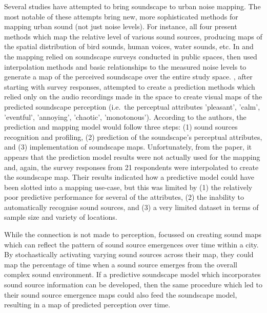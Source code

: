 \documentclass[
  authoryear,
  preprint,
  1p]{elsarticle}
\begin{document}
Several studies have attempted to bring soundscape to urban noise
mapping. The most notable of these attempts
\citep{Aumond2018Probabilistic, Aletta2015Soundscape, Hong2017Exploring, Kang2018Impact}
bring new, more sophisticated methods for mapping urban sound (not just
noise levels). For instance, all four present methods which map the
relative level of various sound sources, producing maps of the spatial
distribution of bird sounds, human voices, water sounds, etc. In
\citet{Aletta2015Soundscape} and \citet{Hong2017Exploring} the mapping
relied on soundscape surveys conducted in public spaces, then used
interpolation methods and basic relationships to the measured noise
levels to generate a map of the perceived soundscape over the entire
study space. \citet{Kang2018model}, after starting with survey
responses, attempted to create a prediction methods which relied only on
the audio recordings made in the space to create visual maps of the
predicted soundscape perception (i.e.~the perceptual attributes
'pleasant', 'calm', 'eventful', 'annoying', 'chaotic', 'monotonous').
According to the authors, the prediction and mapping model would follow
three steps: (1) sound sources recognition and profiling, (2) prediction
of the soundscape's perceptual attributes, and (3) implementation of
soundscape maps. Unfortunately, from the paper, it appears that the
prediction model results were not actually used for the mapping and,
again, the survey responses from 21 respondents were interpolated to
create the soundscape map. Their results indicated how a predictive
model could have been slotted into a mapping use-case, but this was
limited by (1) the relatively poor predictive performance for several of
the attributes, (2) the inability to automatically recognise sound
sources, and (3) a very limited dataset in terms of sample size and
variety of locations.

While the connection is not made to perception,
\citet{Aumond2018Probabilistic} focussed on creating sound maps which
can reflect the pattern of sound source emergences over time within a
city. By stochastically activating varying sound sources across their
map, they could map the percentage of time when a sound source emerges
from the overall complex sound environment. If a predictive soundscape
model which incorporates sound source information can be developed, then
the same procedure which led to their sound source emergence maps could
also feed the soundscape model, resulting in a map of predicted
perception over time.
\end{document}
